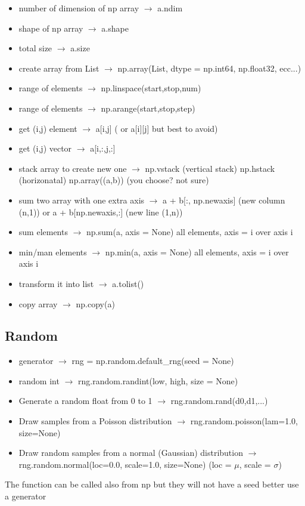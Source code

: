 \documentclass{article}
\begin{document}
\begin{multicols}{2}
\begin{itemize}
\item number of dimension of np array $\rightarrow$ a.ndim
\item shape of np array $\rightarrow$ a.shape
\item total size  $\rightarrow$ a.size
\item create array from List $\rightarrow$ np.array(List, dtype = np.int64, np.float32, ecc...)
\item range of elements $\rightarrow$ np.linspace(start,stop,num)
\item range of elements $\rightarrow$ np.arange(start,stop,step)
\item get (i,j) element $\rightarrow$ a[i,j] ( or  a[i][j]  but best to avoid)
\item get (i,j) vector $\rightarrow$ a[i,:,j,:] 
\item stack array to create new one $\rightarrow$ np.vstack (vertical stack) np.hstack (horizonatal) np.array((a,b)) (you choose? not sure)
\item sum two array with one extra axis   $\rightarrow$ a + b[:, np.newaxis] (new column (n,1)) or a + b[np.newaxis,:] (new line (1,n))
\item sum  elements  $\rightarrow$ np.sum(a, axis = None) all elements, axis = i over axis i
\item min/man  elements  $\rightarrow$ np.min(a, axis = None) all elements, axis = i over axis i
\item transform it into list $\rightarrow$ a.tolist()
\item copy array $\rightarrow$ np.copy(a)
\end{itemize}
\subsection{Random}
\begin{itemize}
\item generator  $\rightarrow$ rng = np.random.default\_rng(seed = None)
\item random int $\rightarrow$  rng.random.randint(low, high, size = None)
\item Generate a random float from 0 to 1 $\rightarrow$ rng.random.rand(d0,d1,...)
\item Draw samples from a Poisson distribution $\rightarrow$ rng.random.poisson(lam=1.0, size=None)
\item Draw random samples from a normal (Gaussian) distribution $\rightarrow$ rng.random.normal(loc=0.0, scale=1.0, size=None) (loc = $\mu$, scale = $\sigma$)
\end{itemize}
The function can be called also from np but they will not have a seed better use a generator


\end{multicols}
\end{document}
